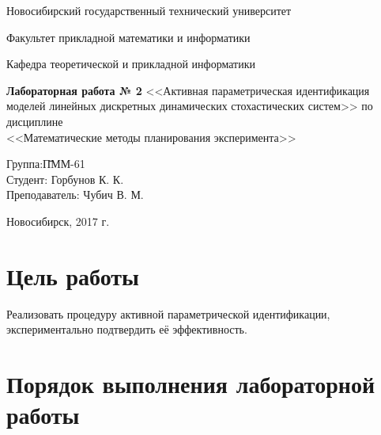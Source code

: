 \documentclass[a4paper,14pt]{extarticle}
\begin{document}
\setcounter{secnumdepth}{0}

\begin{titlepage}

  \begin{center}
    Новосибирский государственный технический университет
    
    Факультет прикладной математики и информатики
    
    Кафедра теоретической и прикладной информатики
    
    \vspace{250pt}
    
    \textbf{\Large{Лабораторная работа № 2}}
    \medbreak
		<<Активная параметрическая идентификация моделей линейных дискретных
		динамических стохастических систем>> \medbreak
    по дисциплине \\
    \medbreak
    <<Математические методы планирования эксперимента>>
    \vspace{100pt}
  \end{center}

  \begin{flushleft}
    \begin{tabbing}
      Группа:\qquad\qquad \= ПММ-61\\
      Студент:            \> Горбунов К. К.\\
      Преподаватель:      \> Чубич В. М.\\
    \end{tabbing}
  \end{flushleft}

  \begin{center}
    \vspace{\fill}
    Новосибирск, 2017 г.
  \end{center}

\end{titlepage}

\newpage

\section{Цель работы}

Реализовать процедуру активной параметрической идентификации, экспериментально
подтвердить её эффективность.

\section{Порядок выполнения лабораторной работы}
\end{document}
